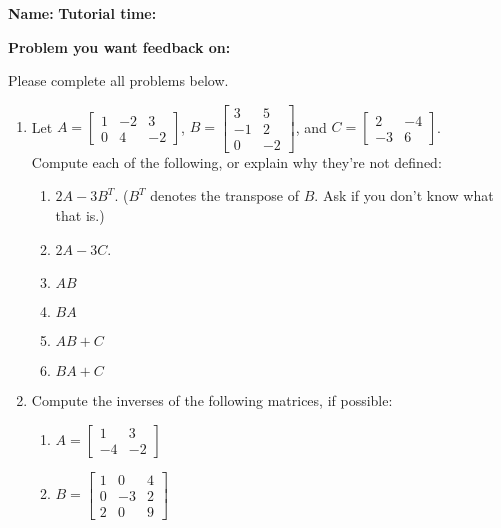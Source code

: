 \documentclass[12pt]{article}
\newcommand{\di}{\displaystyle}
\newcommand{\bbm}{\begin{bmatrix}}
\newcommand{\ebm}{\end{bmatrix}}
\begin{document}
{\bf \large Name:} \hspace{2.5in} {\bf Tutorial time:}

\bigskip

{\bf Problem you want feedback on:}

\bigskip

\thispagestyle{fancy}
Please complete all problems below.
 \begin{enumerate}
 \item Let $A=\di \bbm 1&-2&3\\0&4&-2\ebm$, $B=\di \bbm 3&5\\-1&2\\0&-2\ebm$, and $C=\di \bbm 2&-4\\-3&6\ebm$.\\ Compute each of the following, or explain why they're not defined:
\begin{enumerate}
 \item $2A-3B^T$. ($B^T$ denotes the transpose of $B$. Ask if you don't know what that is.)

\vspace{2in}

 \item $2A-3C$.

\vspace{1.25in}

 \item $AB$

\newpage

 \item $BA$

\vspace{3.5in}

 \item $AB+C$

\vspace{2.5in}

 \item $BA+C$


\end{enumerate}
\newpage

\item Compute the inverses of the following matrices, if possible:
\begin{enumerate}
 \item $A=\di \bbm 1& 3\\-4&-2\ebm$

\vspace{3in}

 \item $B = \di \bbm 1&0&4\\0&-3&2\\2&0&9\ebm$


\end{enumerate}
\end{enumerate}
\end{document}
